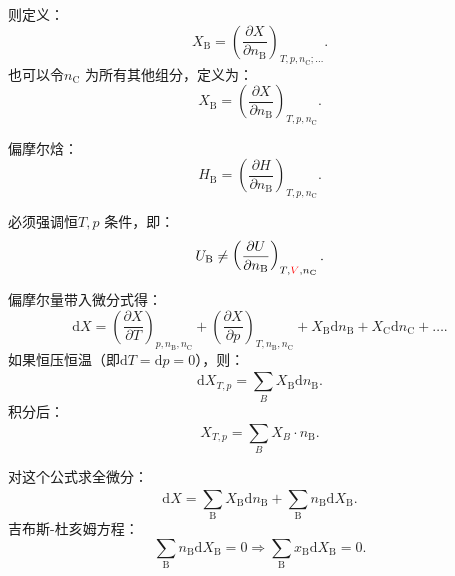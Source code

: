 则定义：\[\boxed{
    X_\text{B} = \left(\frac{\partial X}{\partial n_\text{B}}\right)_{T,p,n_\text{C};\ldots }
.}\]
也可以令$n_\text{C}$ 为所有其他组分，定义为：\begin{equation}
    \label{eq:偏摩尔量}
    \boxed{
        X_\text{B} = \left(\frac{\partial X}{\partial n_\text{B}}\right)_{T,p,n_\text{C}}
    .}
\end{equation}
\begin{eg}
    偏摩尔焓：
    \[
        H_\text{B} = \left(\frac{\partial H}{\partial n_\text{B}}\right)_{T,p,n_\text{C}}
    .\]
\end{eg}
\begin{notation}
    必须强调恒$T,p$ 条件，即：\[
        U_\text{B}\neq \left(\frac{\partial U}{\partial n_\text{B}}\right)_{T,\textcolor{red}{V},n_\text{C}}
    .\]
\end{notation}
偏摩尔量带入微分式得：\[
    \mathrm{d}X = \left(\frac{\partial X}{\partial T}\right)_{p,n_\text{B},n_\text{C}} + \left(\frac{\partial X}{\partial p}\right)_{T,n_\text{B},n_\text{C}}+X_\text{B}\mathrm{d}n_\text{B}+X_\text{C}\mathrm{d}n_\text{C}+\ldots 
.\]
如果恒压恒温（即$\mathrm{d}T=\mathrm{d}p=0$），则：\[\boxed{
    \mathrm{d}X_{T,p} = \sum_{B}^{} X_\text{B}\mathrm{d}n_\text{B}
.}\]
积分后：\[\boxed{
    X_{T,p} = \sum_{B}^{} X_B\cdot n_\text{B}
.}\]
\begin{notation}
    对这个公式求全微分：
    \[
        \mathrm{d}X = \sum_{\text{B}}^{} X_\text{B}\mathrm{d}n_\text{B} + \sum_{\text{B}}^{} n_\text{B}\mathrm{d}X_\text{B}
    .\]
    吉布斯-杜亥姆方程：\[
        \sum_{\text{B}}n_\text{B}\mathrm{d}X_\text{B} = 0 \Rightarrow \sum_{\text{B}}x_\text{B}\mathrm{d}X_\text{B} =0
    .\]
\end{notation}
